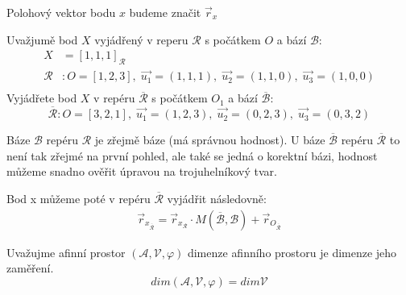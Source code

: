 \begin{definition}
Polohový vektor bodu $x$ budeme značit $\vec{r}_x$
\end{definition}

\begin{example}
    Uvažjumě bod $X$ vyjádřený v reperu $\mathcal{R}$ s počátkem $O$ a bází $\mathcal{B}$:
    \begin{align*}
        X &= [1, 1, 1]_\mathcal{R}\\
        \mathcal{R} &: O = [1, 2, 3],\; \vec{u_1} = (1, 1, 1),\; \vec{u_2} = (1,1,0),\;\vec{u_3} = (1, 0, 0)\\
    \end{align*}
    Vyjádřete bod $X$ v repéru $\overline{\mathcal{R}}$ s počátkem $O_1$ a bází $\overline{\mathcal{B}}$:
    $$\overline{\mathcal{R}} : O = [3, 2, 1],\; \vec{u_1} = (1, 2, 3),\; \vec{u_2} = (0,2,3),\;\vec{u_3} = (0, 3, 2)$$

    Báze $\mathcal{B}$ repéru $\mathcal{R}$ je zřejmě báze (má správnou hodnost). U báze $\overline{\mathcal{B}}$ repéru
    $\overline{\mathcal{R}}$ to není tak zřejmé na první pohled, ale také se jedná o korektní bázi, hodnost můžeme snadno
    ověřit úpravou na trojuhelníkový tvar.

    Bod x můžeme poté v repéru $\overline{\mathcal{R}}$ vyjádřit následovně:
    \begin{align*}
        \vec{r}_{x_{\overline{\mathcal{R}}}} = \vec{r}_{x_{\mathcal{R}}} \cdot
            M(\overline{\mathcal{B}}, \mathcal{B}) + \vec{r}_{O_{\overline{\mathcal{R}}}}
    \end{align*}
\end{example}

\begin{definition}
    Uvažujme afinní prostor $(\mathcal{A}, \mathcal{V}, \varphi)$ dimenze afinního
    prostoru je dimenze jeho zaměření.
    $$dim (\mathcal{A}, \mathcal{V}, \varphi) = dim \mathcal{V}$$
\end{definition}

